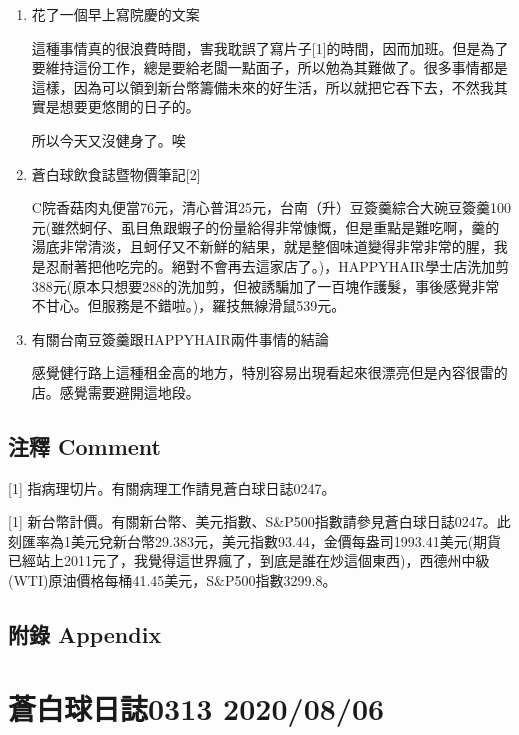 \documentclass[a5paper, 11pt
]{book}
\begin{document}
\begin{enumerate}
\def\labelenumi{\arabic{enumi}.}
\item
  花了一個早上寫院慶的文案

  這種事情真的很浪費時間，害我耽誤了寫片子{[}1{]}的時間，因而加班。但是為了要維持這份工作，總是要給老闆一點面子，所以勉為其難做了。很多事情都是這樣，因為可以領到新台幣籌備未來的好生活，所以就把它吞下去，不然我其實是想要更悠閒的日子的。

  所以今天又沒健身了。唉
\item
  蒼白球飲食誌暨物價筆記{[}2{]}

  C院香菇肉丸便當76元，清心普洱25元，台南（升）豆簽羹綜合大碗豆簽羹100元(雖然蚵仔、虱目魚跟蝦子的份量給得非常慷慨，但是重點是難吃啊，羹的湯底非常清淡，且蚵仔又不新鮮的結果，就是整個味道變得非常非常的腥，我是忍耐著把他吃完的。絕對不會再去這家店了。)，HAPPYHAIR學士店洗加剪388元(原本只想要288的洗加剪，但被誘騙加了一百塊作護髮，事後感覺非常不甘心。但服務是不錯啦。)，羅技無線滑鼠539元。
\item
  有關台南豆簽羹跟HAPPYHAIR兩件事情的結論

  感覺健行路上這種租金高的地方，特別容易出現看起來很漂亮但是內容很雷的店。感覺需要避開這地段。
\end{enumerate}

\hypertarget{ux6ce8ux91cb-comment-56}{%
\subsection{注釋 Comment}\label{ux6ce8ux91cb-comment-56}}

{[}1{]} 指病理切片。有關病理工作請見蒼白球日誌0247。

{[}1{]}
新台幣計價。有關新台幣、美元指數、S\&P500指數請參見蒼白球日誌0247。此刻匯率為1美元兌新台幣29.383元，美元指數93.44，金價每盎司1993.41美元(期貨已經站上2011元了，我覺得這世界瘋了，到底是誰在炒這個東西)，西德州中級(WTI)原油價格每桶41.45美元，S\&P500指數3299.8。

\hypertarget{ux9644ux9304-appendix-56}{%
\subsection{附錄 Appendix}\label{ux9644ux9304-appendix-56}}

\hypertarget{ux84bcux767dux7403ux65e5ux8a8c0313-20200806}{%
\section{蒼白球日誌0313
2020/08/06}\label{ux84bcux767dux7403ux65e5ux8a8c0313-20200806}}
\end{document}

